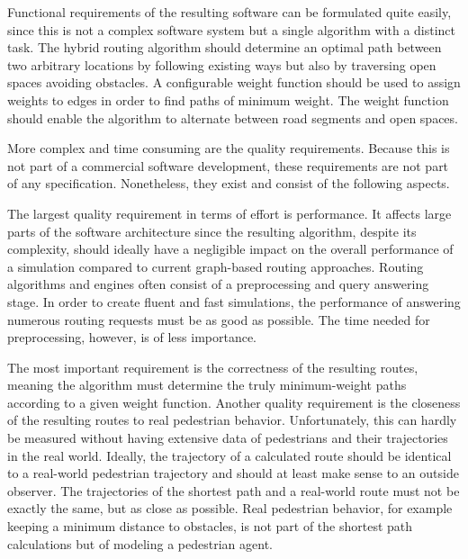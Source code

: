 		Functional requirements of the resulting software can be formulated quite easily, since this is not a complex software system but a single algorithm with a distinct task.
		The hybrid routing algorithm should determine an optimal path between two arbitrary locations by following existing ways but also by traversing open spaces avoiding obstacles.
		A configurable weight function should be used to assign weights to edges in order to find paths of minimum weight.
		The weight function should enable the algorithm to alternate between road segments and open spaces.
		
		More complex and time consuming are the quality requirements.
		Because this is not part of a commercial software development, these requirements are not part of any specification.
		Nonetheless, they exist and consist of the following aspects.
	
		The largest quality requirement in terms of effort is performance.
		It affects large parts of the software architecture since the resulting algorithm, despite its complexity, should ideally have a negligible impact on the overall performance of a simulation compared to current graph-based routing approaches.
		Routing algorithms and engines often consist of a preprocessing and query answering stage.
		In order to create fluent and fast simulations, the performance of answering numerous routing requests must be as good as possible.
		The time needed for preprocessing, however, is of less importance.
		
		The most important requirement is the correctness of the resulting routes, meaning the algorithm must determine the truly minimum-weight paths according to a given weight function.
		Another quality requirement is the closeness of the resulting routes to real pedestrian behavior.
		Unfortunately, this can hardly be measured without having extensive data of pedestrians and their trajectories in the real world.
		Ideally, the trajectory of a calculated route should be identical to a real-world pedestrian trajectory and should at least make sense to an outside observer.
		The trajectories of the shortest path and a real-world route must not be exactly the same, but as close as possible.
		Real pedestrian behavior, for example keeping a minimum distance to obstacles, is not part of the shortest path calculations but of modeling a pedestrian agent.
	
